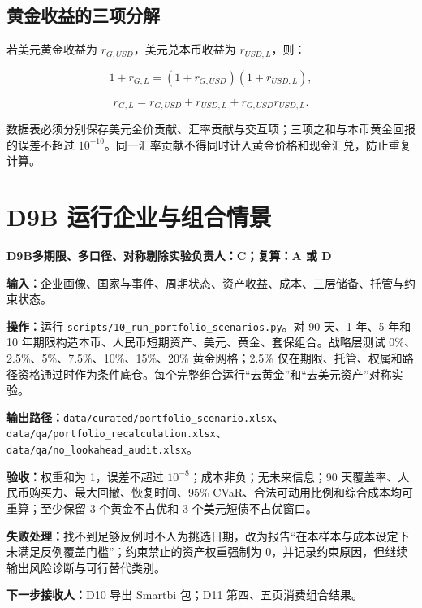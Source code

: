 \documentclass[UTF8,fontset=windows,12pt,openany]{ctexbook}
\newcommand{\File}[1]{{\small\nolinkurl{#1}}}
\newcommand{\StepTitle}[3]{%
  \noindent\colorbox{DeepNavy}{\parbox{0.965\textwidth}{\color{white}\Large\bfseries #1\quad #2\hfill\normalsize #3}}\par\medskip
}
\newcommand{\CardRow}[2]{\noindent\textbf{#1：}#2\par}
\begin{document}
\subsection{黄金收益的三项分解}

若美元黄金收益为 \(r_{G,USD}\)，美元兑本币收益为 \(r_{USD,L}\)，则：

\begin{equation}
1+r_{G,L}=(1+r_{G,USD})(1+r_{USD,L}),
\end{equation}

\begin{equation}
r_{G,L}=r_{G,USD}+r_{USD,L}+r_{G,USD}r_{USD,L}.
\end{equation}

数据表必须分别保存美元金价贡献、汇率贡献与交互项；三项之和与本币黄金回报的误差不超过 \(10^{-10}\)。同一汇率贡献不得同时计入黄金价格和现金汇兑，防止重复计算。

\newpage
\section{D9B 运行企业与组合情景}
\StepTitle{D9B}{多期限、多口径、对称剔除实验}{负责人：C；复算：A 或 D}
\CardRow{输入}{企业画像、国家与事件、周期状态、资产收益、成本、三层储备、托管与约束状态。}
\CardRow{操作}{运行 \File{scripts/10_run_portfolio_scenarios.py}。对 90 天、1 年、5 年和 10 年期限构造本币、人民币短期资产、美元、黄金、套保组合。战略层测试 0\%、2.5\%、5\%、7.5\%、10\%、15\%、20\% 黄金网格；2.5\% 仅在期限、托管、权属和路径资格通过时作为条件底仓。每个完整组合运行“去黄金”和“去美元资产”对称实验。}
\CardRow{输出路径}{\File{data/curated/portfolio_scenario.xlsx}、\File{data/qa/portfolio_recalculation.xlsx}、\File{data/qa/no_lookahead_audit.xlsx}。}
\CardRow{验收}{权重和为 1，误差不超过 \(10^{-8}\)；成本非负；无未来信息；90 天覆盖率、人民币购买力、最大回撤、恢复时间、95\% CVaR、合法可动用比例和综合成本均可重算；至少保留 3 个黄金不占优和 3 个美元短债不占优窗口。}
\CardRow{失败处理}{找不到足够反例时不人为挑选日期，改为报告“在本样本与成本设定下未满足反例覆盖门槛”；约束禁止的资产权重强制为 0，并记录约束原因，但继续输出风险诊断与可行替代类别。}
\CardRow{下一步接收人}{D10 导出 Smartbi 包；D11 第四、五页消费组合结果。}
\end{document}
